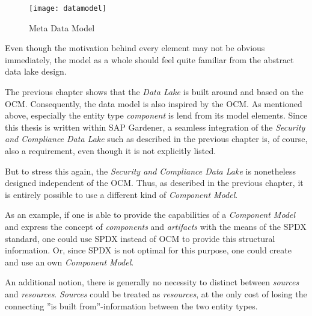 \begin{figure}[H]
	\centering
	\texttt{[image: datamodel]}
	\caption[Meta Data Model]{Meta Data Model }
	\label{fig:DataModel}
\end{figure} 

Even though the motivation behind every element may not be obvious immediately, the model as a whole should feel quite familiar from the abstract data lake design.\par
The previous chapter shows that the \emph{Data Lake} is built around and based on the OCM. Consequently, the data model is also inspired by the OCM. As mentioned above, especially the entity type \emph{component} is lend from its model elements. Since this thesis is written within SAP Gardener, a seamless integration of the \emph{Security and Compliance Data Lake} such as described in the previous chapter is, of course, also a requirement, even though it is not explicitly listed.\par
But to stress this again, the \emph{Security and Compliance Data Lake} is nonetheless designed independent of the OCM. Thus, as described in the previous chapter, it is entirely possible to use a different kind of \emph{Component Model}.\par 
As an example, if one is able to provide the capabilities of a \emph{Component Model} and express the concept of \emph{components} and \emph{artifacts} with the means of the SPDX standard, one could use SPDX instead of OCM to provide this structural information. Or, since SPDX is not optimal for this purpose, one could create and use an own \emph{Component Model}.\par
An additional notion, there is generally no necessity to distinct between \emph{sources} and \emph{resources}. \emph{Sources} could be treated as \emph{resources}, at the only cost of losing the connecting ''is built from''-information between the two entity types.

